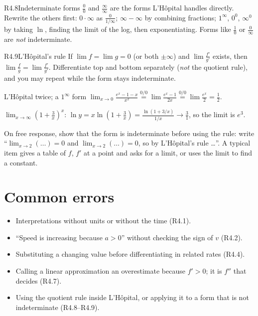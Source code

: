 \documentclass{apcalc}
\begin{document}
\begin{rulebox}{R4.8}{Indeterminate forms}
$\frac00$ and $\frac{\infty}{\infty}$ are the forms L'H\^opital handles directly. Rewrite the others first: $0\cdot\infty$ as $\frac{0}{1/\infty}$; $\infty-\infty$ by combining fractions; $1^\infty$, $0^0$, $\infty^0$ by taking $\ln$, finding the limit of the log, then exponentiating. Forms like $\frac{1}{0}$ or $\frac{0}{\infty}$ are \emph{not} indeterminate.
\end{rulebox}

\begin{rulebox}{R4.9}{L'H\^opital's rule}
If $\lim f=\lim g=0$ (or both $\pm\infty$) and $\lim\frac{f'}{g'}$ exists, then $\lim\frac{f}{g}=\lim\frac{f'}{g'}$. Differentiate top and bottom separately (\emph{not} the quotient rule), and you may repeat while the form stays indeterminate.
\end{rulebox}

\begin{example}{L'H\^opital twice; a $1^\infty$ form}
$\displaystyle\lim_{x\to0}\frac{e^x-1-x}{x^2}\overset{0/0}{=}\lim\frac{e^x-1}{2x}\overset{0/0}{=}\lim\frac{e^x}{2}=\frac12.$\par
$\displaystyle\lim_{x\to\infty}\left(1+\frac3x\right)^x$: $\ln y=x\ln(1+\frac3x)=\frac{\ln(1+3/x)}{1/x}\to\frac{3}{1}$, so the limit is $e^3$.
\end{example}

\begin{frqtip}
On free response, show that the form is indeterminate before using the rule: write ``$\lim_{x\to2}(\ldots)=0$ and $\lim_{x\to2}(\ldots)=0$, so by L'H\^opital's rule \dots''. A typical item gives a table of $f$, $f'$ at a point and asks for a limit, or uses the limit to find a constant.
\end{frqtip}

\section{Common errors}
\begin{itemize}
\item Interpretations without units or without the time (R4.1).
\item ``Speed is increasing because $a>0$'' without checking the sign of $v$ (R4.2).
\item Substituting a changing value before differentiating in related rates (R4.4).
\item Calling a linear approximation an overestimate because $f'>0$; it is $f''$ that decides (R4.7).
\item Using the quotient rule inside L'H\^opital, or applying it to a form that is not indeterminate (R4.8--R4.9).
\end{itemize}
\end{document}
